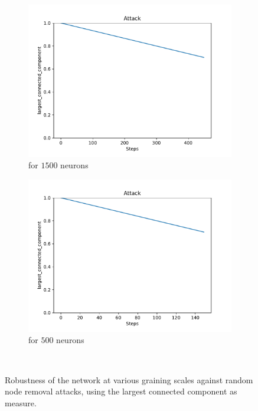 \begin{figure}
	\\ \vspace{5mm}
	\begin{subfigure}[b]{0.45\textwidth}
		\centering
		\includegraphics[width=\textwidth]{Images/plots_rnd/rnd_38.pdf}
		\caption{for $1500$ neurons}
	\end{subfigure}
	\hfill
	\begin{subfigure}[b]{0.45\textwidth}
		\centering
		\includegraphics[width=\textwidth]{Images/plots_rnd/rnd_40.pdf}
		\caption{for $500$ neurons}
	\end{subfigure}
	\\ \vspace{5mm}
	

	\caption{Robustness of the network at various graining scales against random node removal attacks, using the largest connected component as measure.}
	\label{fig:rnd_atk}
\end{figure}


